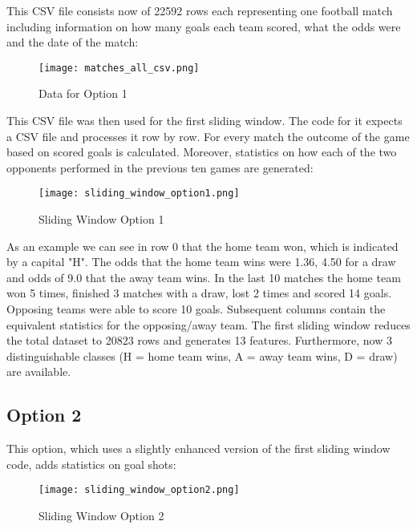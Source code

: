 This CSV file consists now of 22592 rows each representing one football match including information on how many goals each team scored, what the odds were and the date of the match:

\begin{figure}[H]
\begin{center}
\texttt{[image: matches\_all\_csv.png]}
\end{center}
\caption{Data for Option 1}
\label{fig:matches_all_csv}
\end{figure}

This CSV file was then used for the first sliding window. The code for it \cite{sliding01} expects a CSV file and processes it row by row. For every match the outcome of the game based on scored goals is calculated. Moreover, statistics on how each of the two opponents performed in the previous ten games are generated:

\begin{figure}[H]
\begin{center}
\texttt{[image: sliding\_window\_option1.png]}
\end{center}
\caption{Sliding Window Option 1}
\label{fig:sliding_window_option1}
\end{figure}

As an example we can see in row 0 that the home team won, which is indicated by a capital "H". The odds that the home team wins were 1.36, 4.50 for a draw and odds of 9.0 that the away team wins. In the last 10 matches the home team won 5 times, finished 3 matches with a draw, lost 2 times and scored 14 goals. Opposing teams were able to score 10 goals. Subsequent columns contain the equivalent statistics for the opposing/away team. The first sliding window reduces the total dataset to 20823 rows and generates 13 features. Furthermore, now 3 distinguishable classes (H = home team wins, A = away team wins, D = draw) are available.


\subsection {Option 2}
This option, which uses a slightly enhanced version \cite{sliding02} of the first sliding window code, adds statistics on goal shots:

\begin{figure}[H]
\begin{center}
\texttt{[image: sliding\_window\_option2.png]}
\end{center}
\caption{Sliding Window Option 2}
\label{fig:sliding_window_option2}
\end{figure}

